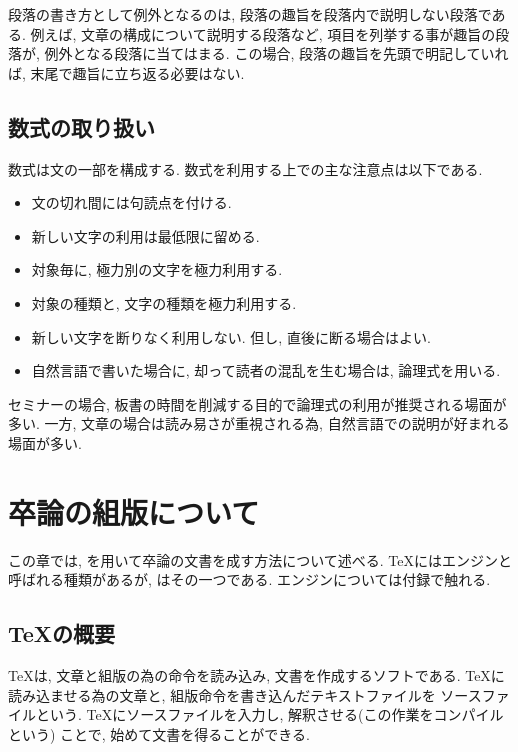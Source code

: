 \documentclass[12pt,xelatex,ja=standard]{bxjsarticle}
\begin{document}
段落の書き方として例外となるのは,
段落の趣旨を段落内で説明しない段落である.
例えば,
文章の構成について説明する段落など,
項目を列挙する事が趣旨の段落が,
例外となる段落に当てはまる.
この場合,
段落の趣旨を先頭で明記していれば,
末尾で趣旨に立ち返る必要はない.

\subsection{数式の取り扱い}
数式は文の一部を構成する.
数式を利用する上での主な注意点は以下である.
\begin{itemize}
\item 文の切れ間には句読点を付ける.
\item 新しい文字の利用は最低限に留める.
\item 対象毎に, 極力別の文字を極力利用する.
\item 対象の種類と, 文字の種類を極力利用する.
\item 新しい文字を断りなく利用しない. 但し, 直後に断る場合はよい.
\item 自然言語で書いた場合に, 却って読者の混乱を生む場合は,
論理式を用いる.
\end{itemize}

\begin{Remark}
セミナーの場合, 板書の時間を削減する目的で論理式の利用が推奨される場面が多い.
一方, 文章の場合は読み易さが重視される為,
自然言語での説明が好まれる場面が多い.
\end{Remark}

\section{卒論の組版について}
この章では,
\XeLaTeX を用いて卒論の文書を成す方法について述べる.
\TeX にはエンジンと呼ばれる種類があるが,
\XeLaTeX はその一つである.
エンジンについては付録で触れる.

\subsection{\TeX の概要}
\TeX は, 文章と組版の為の命令を読み込み,
文書を作成するソフトである.
\TeX に読み込ませる為の文章と,
組版命令を書き込んだテキストファイルを
ソースファイルという.
\TeX にソースファイルを入力し,
解釈させる(この作業をコンパイルという)
ことで, 始めて文書を得ることができる.
\end{document}
